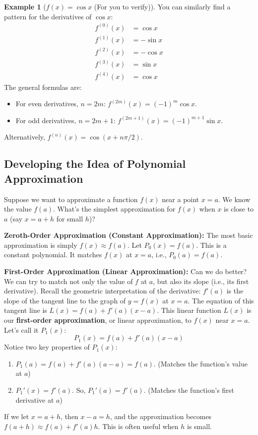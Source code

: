 \documentclass[11pt, a4paper]{article}
\theoremstyle{plain}
\theoremstyle{definition}
\newtheorem{example}[theorem]{Example} %
\theoremstyle{remark}
\begin{document}
\begin{example}[$f(x) = \cos x$ (For you to verify)]
You can similarly find a pattern for the derivatives of $\cos x$:
\begin{align*}
f^{(0)}(x) &= \cos x \\
f^{(1)}(x) &= -\sin x \\
f^{(2)}(x) &= -\cos x \\
f^{(3)}(x) &= \sin x \\
f^{(4)}(x) &= \cos x
\end{align*}
The general formulas are:
\begin{itemize}
    \item For even derivatives, $n=2m$: $f^{(2m)}(x) = (-1)^m \cos x$.
    \item For odd derivatives, $n=2m+1$: $f^{(2m+1)}(x) = (-1)^{m+1} \sin x$.
\end{itemize}
Alternatively, $f^{(n)}(x) = \cos(x + n\pi/2)$.
\end{example}

\subsection{Developing the Idea of Polynomial Approximation}

Suppose we want to approximate a function $f(x)$ near a point $x=a$. We know the value $f(a)$. What's the simplest approximation for $f(x)$ when $x$ is close to $a$ (say $x = a+h$ for small $h$)?

\textbf{Zeroth-Order Approximation (Constant Approximation):}
The most basic approximation is simply $f(x) \approx f(a)$.
Let $P_0(x) = f(a)$. This is a constant polynomial. It matches $f(x)$ at $x=a$, i.e., $P_0(a) = f(a)$.

\textbf{First-Order Approximation (Linear Approximation):}
Can we do better? We can try to match not only the value of $f$ at $a$, but also its slope (i.e., its first derivative).
Recall the geometric interpretation of the derivative: $f'(a)$ is the slope of the tangent line to the graph of $y=f(x)$ at $x=a$.
The equation of this tangent line is $L(x) = f(a) + f'(a)(x-a)$.
This linear function $L(x)$ is our \textbf{first-order approximation}, or linear approximation, to $f(x)$ near $x=a$. Let's call it $P_1(x)$:
\[ P_1(x) = f(a) + f'(a)(x-a) \]
Notice two key properties of $P_1(x)$:
\begin{enumerate}
    \item $P_1(a) = f(a) + f'(a)(a-a) = f(a)$. (Matches the function's value at $a$)
    \item $P_1'(x) = f'(a)$. So, $P_1'(a) = f'(a)$. (Matches the function's first derivative at $a$)
\end{enumerate}
If we let $x = a+h$, then $x-a = h$, and the approximation becomes $f(a+h) \approx f(a) + f'(a)h$. This is often useful when $h$ is small.
\end{document}
